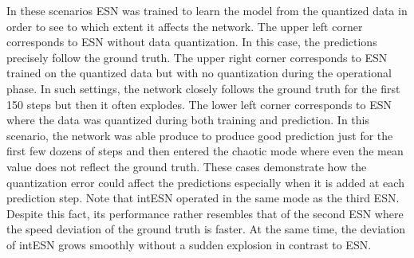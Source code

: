 In these scenarios ESN was trained to learn the model from the  quantized
data in order to see to which extent  it affects the network.
The upper left  corner corresponds to ESN without data quantization. In this
case, the predictions precisely follow the ground truth.  The upper right corner
corresponds to ESN trained on the quantized data but  with no quantization
during the operational phase. In such settings, the network  closely follows the
ground truth for the first 150 steps but then it often explodes.  The lower left
corner corresponds to ESN where the data was quantized during  both training
and prediction. In this scenario, the network was able produce to  produce good
prediction just for the first few dozens of steps and then entered the  chaotic
mode where even the mean value does not reflect the ground truth.  These cases
demonstrate how the quantization error could affect the predictions  especially
when it is added at each prediction step.
Note that intESN operated in  the same mode as the third ESN. Despite this
fact, its performance rather resembles that of  the second ESN where the speed
deviation of the ground truth is faster.  At the same time, the deviation of
intESN grows smoothly without a sudden explosion  in contrast to ESN.




